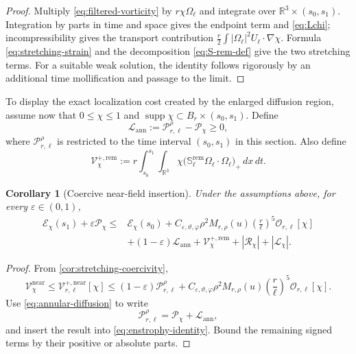 \documentclass[11pt]{article}
\numberwithin{equation}{section}
\theoremstyle{plain}
\newtheorem{corollary}[theorem]{Corollary}
\theoremstyle{definition}
\theoremstyle{remark}
\DeclareMathOperator{\supp}{supp}
\newcommand{\R}{\mathbb R}
\newcommand{\eps}{\varepsilon}
\begin{document}
\begin{proof}
Multiply \eqref{eq:filtered-vorticity} by $r\chi\Omega_\ell$ and integrate over $\R^3\times(s_0,s_1)$. Integration by parts in time and space gives the endpoint term and \eqref{eq:Lchi}; incompressibility gives the transport contribution $\frac r2\int|\Omega_\ell|^2U_\ell\cdot\nabla\chi$. Formula \eqref{eq:stretching-strain} and the decomposition \eqref{eq:S-rem-def} give the two stretching terms. For a suitable weak solution, the identity follows rigorously by an additional time mollification and passage to the limit.
\end{proof}

To display the exact localization cost created by the enlarged diffusion region, assume now that $0\le\chi\le1$ and $\supp\chi\subset B_r\times(s_0,s_1)$. Define
\begin{equation}\label{eq:annular-diffusion}
\mathcal L_{\mathrm{ann}}
:=
\mathcal P_{r,\ell}^{\rho}-\mathcal P_\chi
\ge0,
\end{equation}
where $\mathcal P_{r,\ell}^{\rho}$ is restricted to the time interval $(s_0,s_1)$ in this section. Also define
\begin{equation}\label{eq:Vrem-positive}
\mathcal V_\chi^{+,\mathrm{rem}}
:=r\int_{s_0}^{s_1}\int_{\R^3}
\chi\bigl(\mathbb S_\ell^{\mathrm{rem}}\Omega_\ell\cdot\Omega_\ell\bigr)_+
\,dx\,dt.
\end{equation}

\begin{corollary}[Coercive near-field insertion]\label{cor:balance-insertion}
Under the assumptions above, for every $\eps\in(0,1)$,
\begin{align}
\mathcal E_\chi(s_1)+\eps\mathcal P_\chi
\le{}&
\mathcal E_\chi(s_0)
+
C_{\eps,\vartheta,\varphi}\rho^2M_{r,\rho}(u)
\left(\frac r\ell\right)^5
\mathcal O_{r,\ell}[\chi]
\nonumber\\
&+
(1-\eps)\mathcal L_{\mathrm{ann}}
+
\mathcal V_\chi^{+,\mathrm{rem}}
+
|\mathcal R_\chi|
+
|\mathcal L_\chi|.
\label{eq:balance-coercive}
\end{align}
\end{corollary}

\begin{proof}
From \cref{cor:stretching-coercivity},
\[
\mathcal V_\chi^{\mathrm{near}}
\le
\mathcal V_{r,\ell}^{+,\mathrm{near}}[\chi]
\le
(1-\eps)\mathcal P_{r,\ell}^{\rho}
+
C_{\eps,\vartheta,\varphi}\rho^2M_{r,\rho}(u)
\left(\frac r\ell\right)^5
\mathcal O_{r,\ell}[\chi].
\]
Use \eqref{eq:annular-diffusion} to write
\[
\mathcal P_{r,\ell}^{\rho}
=\mathcal P_\chi+\mathcal L_{\mathrm{ann}},
\]
and insert the result into \eqref{eq:enstrophy-identity}. Bound the remaining signed terms by their positive or absolute parts.
\end{proof}
\end{document}

